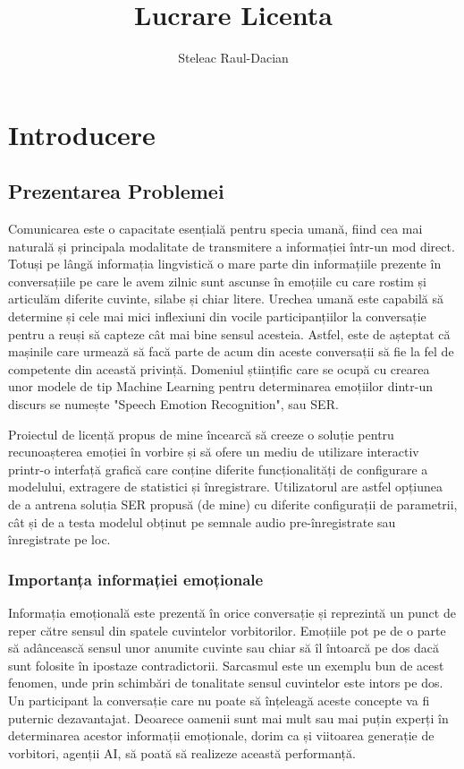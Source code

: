 \documentclass[a4paper,12pt]{book}
\title{Lucrare Licenta}
\author{Steleac Raul-Dacian}
\begin{document}
	
	\clearpage
	\thispagestyle{empty}
	\tableofcontents
	\thispagestyle{empty}
	\clearpage
	\newpage 
	\thispagestyle{empty}
	
	\chapter{Introducere}
	
		\section{Prezentarea Problemei}
						
			\setlength{\parindent}{0.8cm}
			
			Comunicarea este o capacitate esențială pentru specia umană, fiind cea mai naturală și principala modalitate de transmitere a informației într-un mod direct. Totuși pe lângă informația lingvistică o mare parte din informațiile prezente în conversațiile pe care le avem zilnic sunt ascunse în emoțiile cu care rostim și articulăm diferite cuvinte, silabe și chiar litere. Urechea umană este capabilă să determine și cele mai mici inflexiuni din vocile participanțiilor la conversație pentru a reuși să capteze cât mai bine sensul acesteia. Astfel, este de așteptat că mașinile care urmează să facă parte de acum din aceste conversații să fie la fel de competente din această privință. Domeniul științific care se ocupă cu crearea unor modele de tip Machine Learning pentru determinarea emoțiilor dintr-un discurs se numește "Speech Emotion Recognition", sau SER. \par
			
			Proiectul de licență propus de mine încearcă să creeze o soluție pentru recunoașterea emoției în vorbire și să ofere un mediu de utilizare interactiv printr-o interfață grafică care conține diferite funcționalități de configurare a modelului, extragere de statistici și înregistrare. Utilizatorul are astfel opțiunea de a antrena soluția SER propusă (de mine) cu diferite configurații de parametrii, cât și de a testa modelul obținut pe semnale audio pre-înregistrate sau înregistrate pe loc.\par
			
			\subsection{Importanța informației emoționale}
				Informația emoțională este prezentă în orice conversație și reprezintă un punct de reper către sensul din spatele cuvintelor vorbitorilor. Emoțiile pot pe de o parte să adâncească sensul unor anumite cuvinte sau chiar să îl întoarcă pe dos dacă sunt folosite în ipostaze contradictorii. Sarcasmul este un exemplu bun de acest fenomen, unde prin schimbări de tonalitate sensul cuvintelor este intors pe dos. Un participant la conversație care nu poate să înțeleagă aceste concepte va fi puternic dezavantajat. Deoarece oamenii sunt mai mult sau mai puțin experți în determinarea acestor informații emoționale, dorim ca și viitoarea generație de vorbitori, agenții AI, să poată să realizeze această performanță.\par
				
\end{document}

